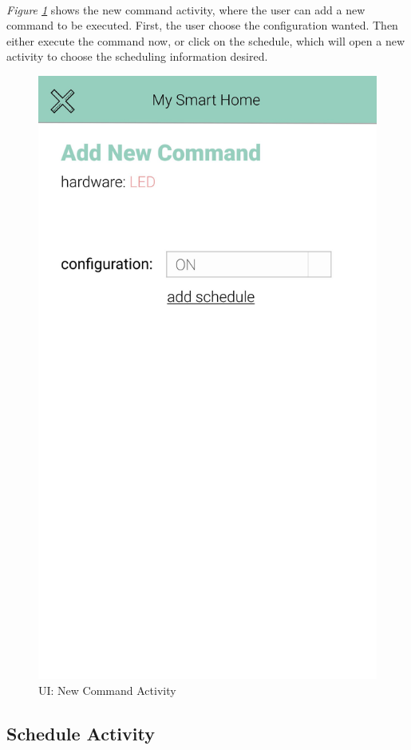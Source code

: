 \documentclass[12pt, oneside, a4paper]{book}
\begin{document}
		\paragraph{} \textit{Figure \ref{fig:activity_new_command}} shows the new command activity, where the user can add a new command to be executed. First, the user choose the configuration wanted. Then either execute the command now, or click on the schedule, which will open a new activity to choose the scheduling information desired.
		\begin{figure}[H]
			\centering
			\includegraphics[width=.5\linewidth]{img/activity_new_command.jpg}
			\caption{UI: New Command Activity}
			\label{fig:activity_new_command}
		\end{figure}
		\newpage\subsection{Schedule Activity}
\end{document}
